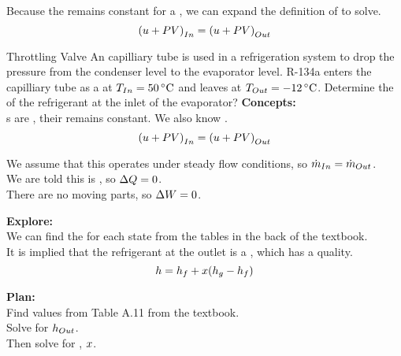 Because the  remains constant for a , we can expand the definition of  to solve.
\begin{equation}\label{eq:Throttling_Valve}
  {(\ensuremath{u}+ \ensuremath{P}\ensuremath{V})}_{In} = {(u + P V)}_{Out}
\end{equation}

\begin{example}{Throttling Valve}
  An  capilliary tube is used in a refrigeration system to drop the pressure from the condenser level to the evaporator level.
  R-134a enters the capilliary tube as a  at $\Temp_{In} = \SI{50}{\degreeCelsius}$ and leaves at $\Temp_{Out} = \SI{-12}{\degreeCelsius}$.
  Determine the  of the refrigerant at the inlet of the evaporator?
  \tcblower{}
  \textbf{Concepts:} \\
  s are , their  remains constant.
  We also know .
  \begin{equation*}
    {(\ensuremath{u}+ \ensuremath{P}\ensuremath{V})}_{In} = {(u + P V)}_{Out}
  \end{equation*}

  We assume that this operates under steady flow conditions, so $\dot{m}_{In} = \dot{m}_{Out}$. \\
  We are told this is , so $\Delta Q = 0$. \\
  There are no moving parts, so $\Delta W = 0$.

  \textbf{Explore:} \\
  We can find the  for each state from the tables in the back of the textbook. \\
  It is implied that the refrigerant at the outlet is a , which has a quality.
  \begin{equation*}
    h = h_{f} + x (h_{g} - h_{f})
  \end{equation*}

  \textbf{Plan:} \\
  Find  values from Table A.11 from the textbook. \\
  Solve for $h_{Out}$. \\
  Then solve for , $x$.


\end{example}
